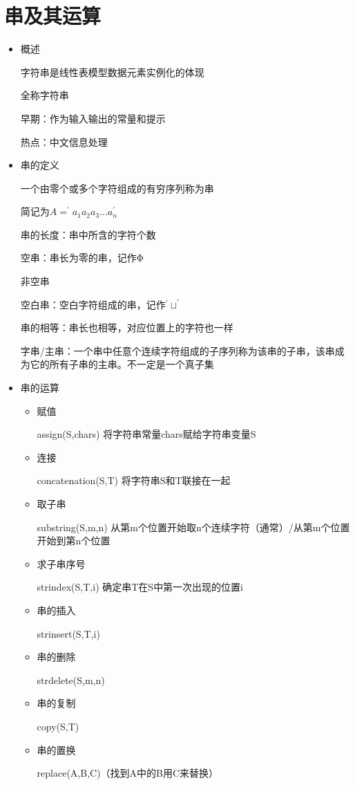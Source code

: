 \documentclass[AutoFakeBold]{LZUThesis2007}
\begin{document}
	\section{串及其运算}
	\begin{itemize}
		\item 概述
		
		字符串是线性表模型数据元素实例化的体现

		全称字符串

		早期：作为输入输出的常量和提示

		热点：中文信息处理
		\item 串的定义
		
		一个由零个或多个字符组成的有穷序列称为串

		简记为$A=^{\prime}a_{1} a_{2} a_{3} \dots a_{n}^{\prime}$

		串的长度：串中所含的字符个数

		空串：串长为零的串，记作Φ
		
		非空串

		空白串：空白字符组成的串，记作$^{\prime}\sqcup^{\prime}$

		串的相等：串长也相等，对应位置上的字符也一样

		字串/主串：一个串中任意个连续字符组成的子序列称为该串的子串，该串成为它的所有子串的主串。不一定是一个真子集
		\item 串的运算
			\begin{itemize}
				\item 赋值
				
				assign(S,chars)  将字符串常量chars赋给字符串变量S
				\item 连接
			
				concatenation(S,T) 将字符串S和T联接在一起
				\item 取子串
			
				substring(S,m,n) 从第m个位置开始取n个连续字符（通常）/从第m个位置开始到第n个位置
				\item 求子串序号
		
				strindex(S,T,i) 确定串T在S中第一次出现的位置i
				\item 串的插入
			
				strinsert(S,T,i)
				\item 串的删除
			
				strdelete(S,m,n)
				\item 串的复制
		
				copy(S,T)
				\item 串的置换
				
				replace(A,B,C)（找到A中的B用C来替换）


\end{itemize}
\end{itemize}
\end{document}
